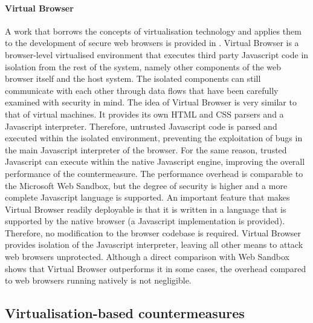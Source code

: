 \paragraph{Virtual Browser}
A work that borrows the concepts of virtualisation technology and applies them to the development of secure web browsers is provided in \cite{virtualbrowser}. Virtual Browser is a browser-level virtualised environment that executes third party Javascript code in isolation from the rest of the system, namely other components of the web browser itself and the host system. The isolated components can still communicate with each other through data flows that have been carefully examined with security in mind. 
The idea of Virtual Browser is very similar to that of virtual machines. It provides its own HTML and CSS parsers and a Javascript interpreter. Therefore, untrusted Javascript code is parsed and executed within the isolated environment, preventing the exploitation of bugs in the main Javascript interpreter of the browser.
For the same reason, trusted Javascript can execute within the native Javascript engine, improving the overall performance of the countermeasure. The performance overhead is comparable to the Microsoft Web Sandbox, but the degree of security is higher and a more complete Javascript language is supported.
An important feature that makes Virtual Browser readily deployable is that it is written in a language that is supported by the native browser (a Javascript implementation is provided). Therefore, no modification to the browser codebase is required. Virtual Browser provides isolation of the Javascript interpreter, leaving all other means to attack web browsers unprotected. Although a direct comparison with Web Sandbox shows that Virtual Browser outperforms it in some cases, the overhead compared to web browsers running natively is not negligible. 



\subsection{Virtualisation-based countermeasures}\label{virtbased}
